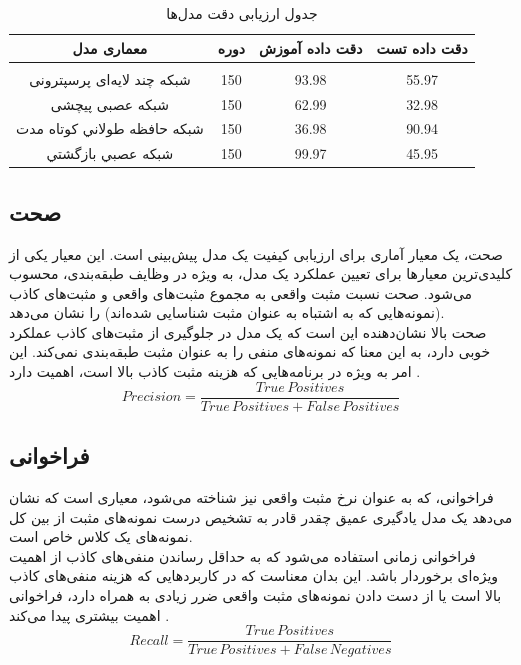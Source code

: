 \begin{table}[h!]
    \centering
    \begin{tabular}{||c c c c||}
     \hline
     \rule{0pt}{3ex} معماری مدل & دوره & دقت داده آموزش & دقت داده تست  \\ [1.5ex]
     \hline
     \hline
     \rule{0pt}{0.5ex} & & & \\  
     شبکه چند لایه‌ای پرسپترونی & 150 & 93.98 \text{\%} & 55.97 \text{\%} \\ [2.5ex]
     شبکه عصبی پیچشی & 150 & 62.99 \text{\%} & 32.98 \text{\%} \\ [2.5ex]
     شبکه حافظه طولاني كوتاه مدت & 150 & 36.98 \text{\%} & 90.94 \text{\%} \\ [2.5ex]
     شبکه عصبي بازگشتي & 150 & 99.97 \text{\%} & 45.95 \text{\%} \\ [2.5ex]
     \hline
    \end{tabular}
    \caption{جدول ارزیابی دقت مدل‌ها}
    \label{table:2}
\end{table}



\subsection{صحت}
صحت، یک معیار آماری برای ارزیابی کیفیت یک مدل پیش‌بینی است. این معیار یکی از کلیدی‌ترین معیارها برای تعیین عملکرد یک مدل، به ویژه در وظایف طبقه‌بندی، محسوب می‌شود. صحت نسبت مثبت واقعی به مجموع مثبت‌های واقعی و مثبت‌های کاذب (نمونه‌هایی که به اشتباه به عنوان مثبت شناسایی شده‌اند) را نشان می‌دهد.
\\
صحت بالا نشان‌دهنده این است که یک مدل در جلوگیری از مثبت‌های کاذب عملکرد خوبی دارد، به این معنا که نمونه‌های منفی را به عنوان مثبت طبقه‌بندی نمی‌کند. این امر به ویژه در برنامه‌هایی که هزینه مثبت کاذب بالا است، اهمیت دارد \cite{Precisio82:online}. 
\begin{equation}
    Precision = \frac{True \, Positives}{True \, Positives + False \, Positives} 
\end{equation}

\subsection{فراخوانی}
فراخوانی، که به عنوان نرخ مثبت واقعی نیز شناخته می‌شود، معیاری است که نشان می‌دهد یک مدل یادگیری عمیق چقدر قادر به تشخیص درست نمونه‌های مثبت از بین کل نمونه‌های یک کلاس خاص است.
\\
فراخوانی زمانی استفاده می‌شود که به حداقل رساندن منفی‌های کاذب از اهمیت ویژه‌ای برخوردار باشد. این بدان معناست که در کاربردهایی که هزینه منفی‌های کاذب بالا است یا از دست دادن نمونه‌های مثبت واقعی ضرر زیادی به همراه دارد، فراخوانی اهمیت بیشتری پیدا می‌کند \cite{Understa37:online}.
\begin{equation}
     Recall = \frac{True \, Positives}{True \, Positives + False \, Negatives} 
\end{equation}

